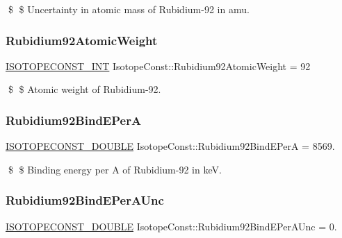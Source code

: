 \$ \$ Uncertainty in atomic mass of Rubidium-\/92 in amu. \mbox{\label{group___isotope_const-_rubidium-_rb92_ga2130b261935b5a3c777ed3bc373b860b}} 
\subsubsection{\texorpdfstring{Rubidium92\+Atomic\+Weight}{Rubidium92AtomicWeight}}
{\footnotesize\ttfamily \mbox{\hyperlink{group___isotope_const-_macros_ga5f18360b3e99483a35c32d789e62621c}{I\+S\+O\+T\+O\+P\+E\+C\+O\+N\+S\+T\+\_\+\+I\+NT}} Isotope\+Const\+::\+Rubidium92\+Atomic\+Weight = 92}

\$ \$ Atomic weight of Rubidium-\/92. \mbox{\label{group___isotope_const-_rubidium-_rb92_ga623173a7fc0ae203a6136dd78e258085}} 
\subsubsection{\texorpdfstring{Rubidium92\+Bind\+E\+PerA}{Rubidium92BindEPerA}}
{\footnotesize\ttfamily \mbox{\hyperlink{group___isotope_const-_macros_ga8f45a7272ce02c0b4c65c44636ed719a}{I\+S\+O\+T\+O\+P\+E\+C\+O\+N\+S\+T\+\_\+\+D\+O\+U\+B\+LE}} Isotope\+Const\+::\+Rubidium92\+Bind\+E\+PerA = 8569.}

\$ \$ Binding energy per A of Rubidium-\/92 in keV. \mbox{\label{group___isotope_const-_rubidium-_rb92_gab13dbf52e66c918c2361af2af63e00fb}} 
\subsubsection{\texorpdfstring{Rubidium92\+Bind\+E\+Per\+A\+Unc}{Rubidium92BindEPerAUnc}}
{\footnotesize\ttfamily \mbox{\hyperlink{group___isotope_const-_macros_ga8f45a7272ce02c0b4c65c44636ed719a}{I\+S\+O\+T\+O\+P\+E\+C\+O\+N\+S\+T\+\_\+\+D\+O\+U\+B\+LE}} Isotope\+Const\+::\+Rubidium92\+Bind\+E\+Per\+A\+Unc = 0.}

